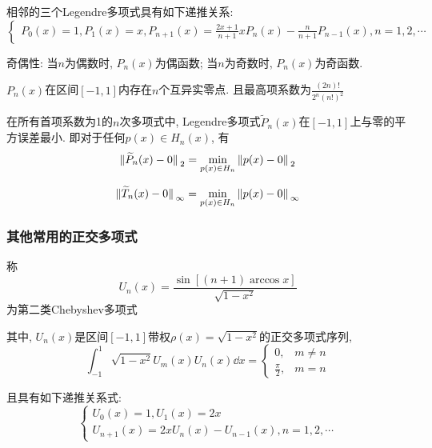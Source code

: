 相邻的三个Legendre多项式具有如下递推关系:
\begin{equation*}
    \begin{cases}
        P_0(x)=1, P_1(x)=x,
        P_{n+1}(x)=\frac{2x+1}{n+1}xP_n(x)-\frac{n}{n+1}P_{n-1}(x), n=1,2,\cdots
    \end{cases}
\end{equation*}

奇偶性: 当$n$为偶数时, $P_n(x)$为偶函数; 当$n$为奇数时, $P_n(x)$为奇函数.

$P_n(x)$在区间$[-1,1]$内存在$n$个互异实零点. 且最高项系数为$\frac{(2n)!}{2^n(n!)^2}$

在所有首项系数为1的$n$次多项式中, Legendre多项式$\widetilde{P}_n(x)$在$[-1,1]$上与零的平方误差最小. 即对于任何$p(x)\in H_n(x)$, 有
\begin{equation*}
    \norm*{\widetilde{P}_n(x)-0}_2=\min_{p(x)\in H_n}\norm*{p(x)-0}_2
\end{equation*}

\begin{extend}
    \begin{equation*}
        \norm*{\widetilde{T}_n(x)-0}_\infty=\min_{p(x)\in H_n}\norm*{p(x)-0}_\infty
    \end{equation*}
\end{extend}

\subsubsection{其他常用的正交多项式}

\begin{definition}[第二类Chebyshev多项式]
    称
    \begin{equation*}
        U_n(x)=\frac{\sin\left[(n+1)\arccos{x}\right]}{\sqrt{1-x^2}}
    \end{equation*}
    为第二类Chebyshev多项式
\end{definition}

其中, ${U_n(x)}$是区间$[-1,1]$带权$\rho(x)=\sqrt{1-x^2}$的正交多项式序列,
\begin{equation*}
    \int_{-1}^1\sqrt{1-x^2}U_m(x)U_n(x)\dd{x}=
    \begin{cases}
        0,&m\ne n\\
        \frac{\pi}{2},&m=n
    \end{cases}
\end{equation*}

且具有如下递推关系式:
\begin{equation*}
    \begin{cases}
        U_0(x)=1, U_1(x)=2x\\
        U_{n+1}(x)=2xU_n(x)-U_{n-1}(x), n=1,2,\cdots
    \end{cases}
\end{equation*}

